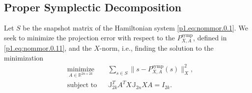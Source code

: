 \subsection{Proper Symplectic Decomposition} \label{sec:normmor.1.1}
Let $S$ be the snapshot matrix of the Hamiltonian system \eqref{p1.eq:nommor.0.1}. We seek to minimize the projection error with respect to the $P_{X,A}^{\text{symp}}$, defined in \eqref{p1.eq:nommor.0.11}, and the $X$-norm, i.e., finding the solution to the minimization
\begin{equation} \label{eq:normmor.3}
\begin{aligned}
& \underset{A\in \mathbb{R}^{2n\times 2k}}{\text{minimize}}
& & \sum_{s\in S} \| s - P_{X,A}^{\text{symp}}(s) \|_X^2, \\
& \text{subject to}
& & \mathbb J_{2k}^T A^T X \mathbb J_{2n} X A = I_{2k}.
\end{aligned}
\end{equation}

